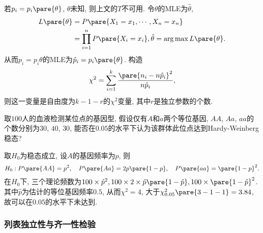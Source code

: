 \documentclass[../Statistics.tex]{subfiles}
\begin{document}
若$p_i = p_i\pare{\theta}$, $\theta$未知, 则上文的$T$不可用. 令$\theta$的MLE为$\hat\theta$,
\begin{align*}
    L\pare{\theta} &= P\pare{X_1 = x_1,\cdots,X_n = x_n} \\
    &= \prod_{i=1}^n P\pare{X_i = x_i},
    \hat\theta = \arg\max L\pare{\theta}.
\end{align*}
从而$p_i = p_i\theta$的MLE为$\hat{p}_i = p_i\pare{\theta}$. 构造
\[ \chi^2 = \sum_{i=1}^k \frac{\pare{n_i - n\hat{p}_i}^2}{n\hat{p}_i}, \]
则这一变量是自由度为$k-1-r$的$\chi^2$变量, 其中$r$是独立参数的个数.


\begin{sample}
    \begin{ex}
        取$100$人的血液检测某位点的基因型, 假设仅有$A$和$a$两个等位基因, $AA$, $Aa$, $aa$的个数分别为$30$, $40$, $30$, 能否在$0.05$的水平下认为该群体此位点达到Hardy-Weinberg稳态?
    \end{ex}
    \begin{solution}
        取$H_0$为稳态成立, 设$A$的基因频率为$p$, 则
        \[ H_0: P\pare{AA} = p^2,\quad P\pare{Aa} = 2p\pare{1-p},\quad P\pare{aa} = \pare{1-p}^2. \]
        在$H_0$下, 三个理论频数为$100\times\hat p^2, 100\times 2\times \hat p\pare{1-\hat p}, 100\times\pare{1-\hat p}^2$. 其中$\hat p$为估计的等位基因频率$0.5$, 从而$\chi^2 = 4$, 大于$\chi^2_{0.05}\pare{3-1-1} = 3.84$, 故可以在$0.05$的水平下未达到.
    \end{solution}
\end{sample}


\subsubsection{列表独立性与齐一性检验} %
\label{ssub:列表独立性与齐一性检验}
\end{document}
